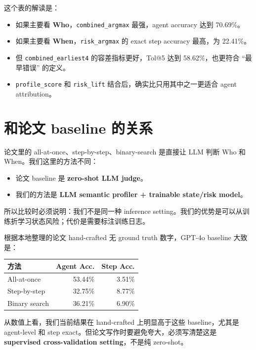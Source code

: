 \documentclass[UTF8,a4paper,11pt]{ctexart}
\begin{document}
这个表的解读是：

\begin{itemize}
  \item 如果主要看 \textbf{Who}，\texttt{combined\_argmax} 最强，agent accuracy 达到 70.69\%。
  \item 如果主要看 \textbf{When}，\texttt{risk\_argmax} 的 exact step accuracy 最高，为 22.41\%。
  \item 但 \texttt{combined\_earliest4} 的容差指标更好，Tol@5 达到 58.62\%，也更符合 ``最早错误'' 的定义。
  \item \texttt{profile\_score} 和 \texttt{risk\_lift} 结合后，确实比只用其中之一更适合 agent attribution。
\end{itemize}

\section{和论文 baseline 的关系}

论文里的 all-at-once、step-by-step、binary-search 是直接让 LLM 判断 Who 和 When。我们这里的方法不同：

\begin{itemize}
  \item 论文 baseline 是 \textbf{zero-shot LLM judge}。
  \item 我们的方法是 \textbf{LLM semantic profiler + trainable state/risk model}。
\end{itemize}

所以比较时必须说明：我们不是同一种 inference setting。我们的优势是可以从训练折学习状态风险；代价是需要标注训练日志。

根据本地整理的论文 hand-crafted 无 ground truth 数字，GPT-4o baseline 大致是：

\begin{table}[htbp]
\centering
\begin{tabular}{lrr}
\toprule
方法 & Agent Acc. & Step Acc. \\
\midrule
All-at-once & 53.44\% & 3.51\% \\
Step-by-step & 32.75\% & 8.77\% \\
Binary search & 36.21\% & 6.90\% \\
\bottomrule
\end{tabular}
\end{table}

从数值上看，我们当前结果在 hand-crafted 上明显高于这些 baseline，尤其是 agent-level 和 step exact。但论文写作时要避免夸大，必须写清楚这是 \textbf{supervised cross-validation setting}，不是纯 zero-shot。
\end{document}
